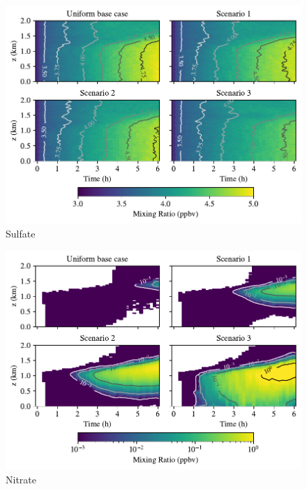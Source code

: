 \newpage
\begin{figure}[h]
  \centering
    \includegraphics[width=\textwidth]{figures/chapter5/height-time-pmc_SO4-four-scenarios.pdf}
    \caption{Sulfate}
    \label{fig:ht-so4}
\end{figure}

\newpage
\begin{figure}[h]
  \centering
    \includegraphics[width=\textwidth]{figures/chapter5/height-time-pmc_NO3-four-scenarios.pdf}
    \caption{Nitrate}
    \label{fig:ht-no3}
\end{figure}

